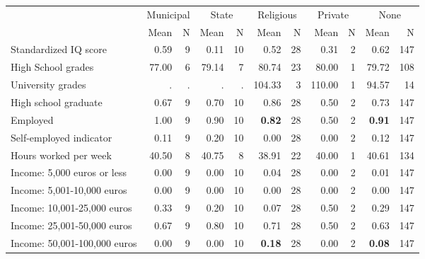 \begin{tabular}{l r r r r r r r r r r}
\toprule
& \multicolumn{2}{c}{Municipal} & \multicolumn{2}{c}{State} & \multicolumn{2}{c}{Religious} & \multicolumn{2}{c}{Private} & \multicolumn{2}{c}{None} \\
& \scriptsize Mean & \scriptsize N & \scriptsize Mean & \scriptsize N & \scriptsize Mean & \scriptsize N & \scriptsize Mean & \scriptsize N & \scriptsize Mean & \scriptsize N \\
\midrule
Standardized IQ score &      0.59 &         9 &      0.11 &        10 &      0.52 &        28 &      0.31 &         2 &      0.62 &       147 \\
High School grades &     77.00 &         6 &     79.14 &         7 &     80.74 &        23 &     80.00 &         1 &     79.72 &       108 \\
University grades &         . & . &         . & . &    104.33 &         3 &    110.00 &         1 &     94.57 &        14 \\
High school graduate &      0.67 &         9 &      0.70 &        10 &      0.86 &        28 &      0.50 &         2 &      0.73 &       147 \\
Employed &      1.00 &         9 &      0.90 &        10 & \textbf{     0.82} &        28 &      0.50 &         2 & \textbf{     0.91} &       147 \\
Self-employed indicator &      0.11 &         9 &      0.20 &        10 &      0.00 &        28 &      0.00 &         2 &      0.12 &       147 \\
Hours worked per week &     40.50 &         8 &     40.75 &         8 &     38.91 &        22 &     40.00 &         1 &     40.61 &       134 \\
Income: 5,000 euros or less &      0.00 &         9 &      0.00 &        10 &      0.04 &        28 &      0.00 &         2 &      0.01 &       147 \\
Income: 5,001-10,000 euros &      0.00 &         9 &      0.00 &        10 &      0.00 &        28 &      0.00 &         2 &      0.00 &       147 \\
Income: 10,001-25,000 euros &      0.33 &         9 &      0.20 &        10 &      0.07 &        28 &      0.50 &         2 &      0.29 &       147 \\
Income: 25,001-50,000 euros &      0.67 &         9 &      0.80 &        10 &      0.71 &        28 &      0.50 &         2 &      0.63 &       147 \\
Income: 50,001-100,000 euros &      0.00 &         9 &      0.00 &        10 & \textbf{     0.18} &        28 &      0.00 &         2 & \textbf{     0.08} &       147 \\

\end{tabular}

